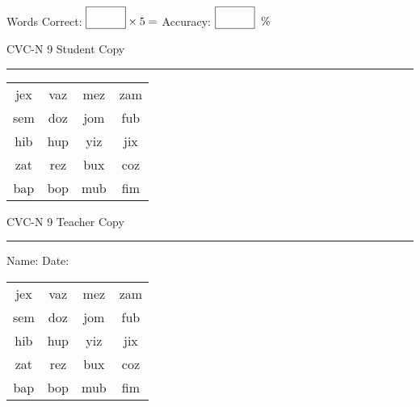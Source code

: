 \documentclass{memoir}
\begin{document}
\small

Words Correct: $\fbox{\phantom{\huge 100}} \times 5 = $ Accuracy: $\fbox{\phantom{\huge 100}}\;\; \%$ 

\vfill

\newpage


\footnotesize \noindent
CVC-N 9 \hfill Student Copy
\smallskip
\hrule

\Large

\setlength{\tabcolsep}{14pt}
\def\arraystretch{2}

{\selectfont


\begin{vplace}[0.5]
\begin{center}
\begin{tabular}{cccc}
jex & vaz & mez & zam \\
sem & doz & jom & fub \\
hib & hup & yiz & jix \\
zat & rez & bux & coz \\
bap & bop & mub & fim \\
\end{tabular}
\end{center}
\end{vplace}

}

\newpage

\footnotesize \noindent
CVC-N 9 \hfill Teacher Copy
\smallskip
\hrule

\small

\vfill

\noindent
Name: \underline{\hspace{1.75in}} \hfill Date: \underline{\hspace{1in}}

\Large

{\selectfont


\begin{vplace}[0.5]
\begin{center}
\begin{tabular}{cccc}
jex & vaz & mez & zam \\
sem & doz & jom & fub \\
hib & hup & yiz & jix \\
zat & rez & bux & coz \\
bap & bop & mub & fim \\
\end{tabular}
\end{center}
\end{vplace}



}
\end{document}
